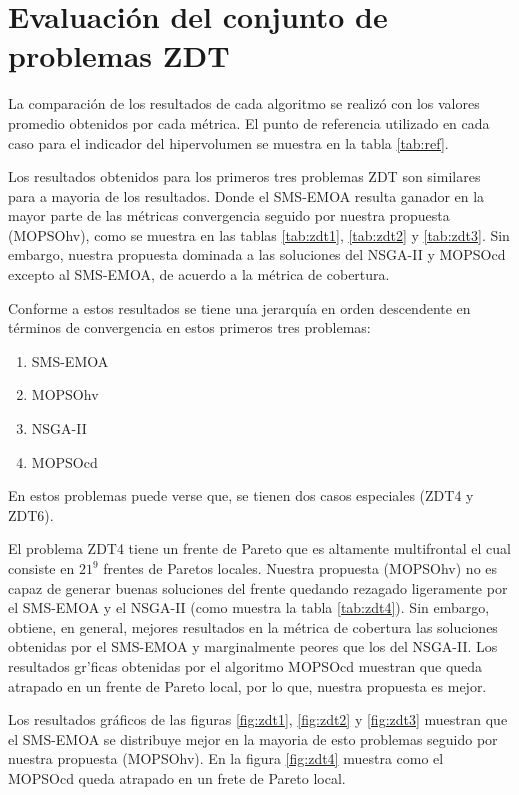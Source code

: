 \newpage
\section{Evaluaci\'on del conjunto de problemas ZDT}
  La comparaci\'on de los resultados de cada algoritmo se realiz\'o con los valores promedio obtenidos por cada m\'etrica.
  El punto de referencia utilizado en cada caso para el indicador del hipervolumen se muestra en la tabla \ref{tab:ref}.
  
  Los resultados obtenidos para los primeros tres problemas ZDT son similares para a mayoria de los resultados. 
  Donde el SMS-EMOA resulta ganador en la mayor parte de las m\'etricas convergencia seguido por nuestra propuesta (MOPSOhv), 
  como se muestra en las tablas \ref{tab:zdt1}, \ref{tab:zdt2} y \ref{tab:zdt3}. Sin embargo, nuestra propuesta 
  dominada a las soluciones del NSGA-II y MOPSOcd excepto al SMS-EMOA, de acuerdo a la m\'etrica de cobertura.
  
  Conforme a estos resultados se tiene una jerarqu\'ia en orden descendente en t\'erminos de convergencia en estos primeros tres 
  problemas:

\begin{enumerate}
  \item SMS-EMOA
  \item MOPSOhv
  \item NSGA-II
  \item MOPSOcd
\end{enumerate}
  
  En estos problemas puede verse que, se tienen dos casos especiales (ZDT4 y ZDT6). 
  
  El problema ZDT4 tiene un frente de Pareto que es altamente multifrontal el cual consiste en $21^9$ frentes de Paretos locales.
  Nuestra propuesta (MOPSOhv) no es capaz de generar buenas soluciones del frente quedando rezagado ligeramente por el SMS-EMOA y el NSGA-II
  (como muestra la tabla \ref{tab:zdt4}). Sin embargo,
  obtiene, en general, mejores resultados en la m\'etrica de cobertura las soluciones obtenidas por el SMS-EMOA y marginalmente 
  peores que los del NSGA-II. Los resultados gr\a'ficas obtenidas por el algoritmo MOPSOcd muestran que queda atrapado en un frente de Pareto 
  local, por lo que, nuestra propuesta es mejor. 
  
  Los resultados gr\'aficos de las figuras \ref{fig:zdt1}, \ref{fig:zdt2} y \ref{fig:zdt3} muestran que el SMS-EMOA se distribuye 
  mejor en la mayoria de esto problemas seguido por nuestra propuesta (MOPSOhv). En la figura \ref{fig:zdt4} muestra como el
  MOPSOcd queda atrapado en un frete de Pareto local.  
  
